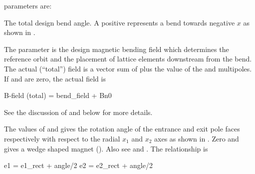  parameters are:
  \begin{description}
  \item[angle] \Newline
The total design bend angle. A positive  represents a
bend towards negative $x$ as shown in .
  \item[bend_field] \Newline
The  parameter is the design magnetic bending field which determines the reference orbit
and the placement of lattice elements downstream from the bend. The actual (``total'') field is
a vector sum of
 plus the value of the   and  multipoles. If  and 
are zero, the actual field is
\begin{example}
  B-field (total) = bend_field + Bn0
\end{example}
See the discussion of  and  below for more details.
  \item[e1, e2] \Newline
The values of  and  gives the rotation angle of the entrance and exit pole faces
respectively with respect to the radial $x_1$ and $x_2$ axes as shown in .
Zero  and  gives a wedge shaped magnet ().
Also see  and . The relationship is
\begin{example}
  e1 = e1_rect + angle/2
  e2 = e2_rect + angle/2
\end{example}


\end{description}
